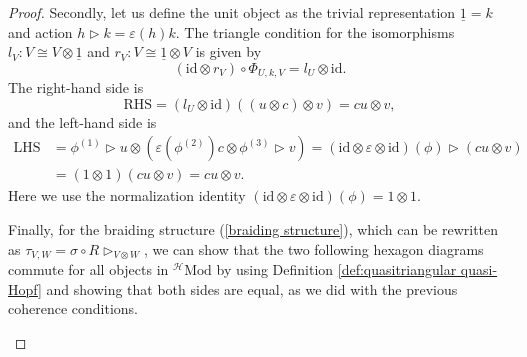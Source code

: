\documentclass[reqno]{amsart}
\theoremstyle{definition}
\theoremstyle{remark}
\begin{document}
\begin{proof}
    Secondly, let us define the unit object as the trivial representation $\underline{1}=k$ and action $h\triangleright k = \varepsilon(h)k$. The triangle condition for the isomorphisms $l_V:V\cong V\otimes \underline{1}$ and $r_V:V\cong \underline{1}\otimes V$ is given by
    \begin{equation}
        (\text{id} \otimes r_V) \circ
\Phi_{U,k,V} = l_U \otimes \text{id}.   \end{equation}
The right-hand side is
\begin{equation}
    \text{RHS}= \left(l_U\otimes \text{id}\right)\left((u\otimes c)\otimes v\right) = cu\otimes v,
\end{equation}
and the left-hand side is
\begin{equation}
    \begin{split}
        \text{LHS}&=\phi^{(1)} \triangleright u \otimes \left(\varepsilon\left(\phi^{(2)}\right)c \otimes \phi^{(3)}\triangleright v\right)= \left(\text{id}\otimes \varepsilon \otimes \text{id}\right)(\phi)\triangleright(cu\otimes v) \\
        &=(1\otimes 1) (cu\otimes v)=cu\otimes v.
    \end{split}
\end{equation}
Here we use the normalization identity $\left(\text{id}\otimes \varepsilon \otimes \text{id}\right)(\phi)=1\otimes 1$. 

Finally, for the braiding structure (\ref{braiding structure}), which can be rewritten as $\tau_{V,W}=\sigma \circ R \triangleright_{V\otimes W}$, we can show that the two following hexagon diagrams commute for all objects in $^{\mathscr{H}}\text{Mod}$ by using Definition \ref{def:quasitriangular quasi-Hopf} and showing that both sides are equal, as we did with the previous coherence conditions. 

\begin{figure}[ht]
    \centering
\end{figure}
\end{proof}
\end{document}
